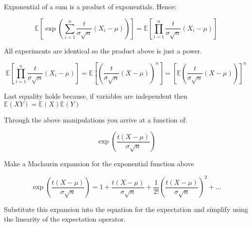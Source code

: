\documentclass[paper=a4, fontsize=11pt]{scrartcl}
\newcommand{\red}[1]{{\color{red}#1}}
\numberwithin{equation}{section}
\numberwithin{figure}{section}
\numberwithin{table}{section}
\begin{document}
\begin{answers}
\vspace{0.25cm}
\red{
Exponential of a sum is a product of exponentials.  Hence:

\begin{equation}
\mathbb{E}\left[ \exp\left( \sum_{i=1}^n
\frac{t}{\sigma\sqrt{n}} (X_i-\mu) \right) \right] = \mathbb{E}\left[
\prod_{i=1}^n \frac{t}{\sigma\sqrt{n}} (X_i-\mu) \right]
\end{equation}

All experiments are identical so the product above is just a power.

\begin{equation}
\mathbb{E}\left[ \prod_{i=1}^n \frac{t}{\sigma\sqrt{n}} (X_i-\mu) \right] =
\mathbb{E}\left[  \left(  \frac{t}{\sigma\sqrt{n}} (X-\mu) \right)^n \right] =
\left[  \mathbb{E}\left(  \frac{t}{\sigma\sqrt{n}} (X-\mu) \right) \right]^n 
\end{equation}

Last equality holds because, if variables are independent then
$\mathbb{E}(XY)=\mathbb{E}(X)\mathbb{E}(Y)$
}
\vspace{0.25cm}
\end{answers}


\noindent Through the above manipulations you arrive at a function of:

\begin{equation}
\exp\left( \frac{t(X-\mu)}{\sigma \sqrt{n}} \right) 
\label{eqn:ll}
\end{equation}

\noindent Make a Maclaurin expansion for the exponential function
above

\begin{questions}
\vspace{5cm}
\end{questions}

\begin{answers}
\vspace{0.25cm}
\red{
\begin{equation}
\exp\left( \frac{t(X-\mu)}{\sigma \sqrt{n}} \right)  = 1 +
\frac{t(X-\mu)}{\sigma \sqrt{n}} + \frac{1}{2!} \left( \frac{t(X-\mu)}{\sigma
\sqrt{n}}\right)^2 + \dots
\end{equation}
}
\end{answers}

\noindent Substitute this expansion into the equation for the expectation and
simplify
using the linearity of the expectation operator. 
\end{document}
